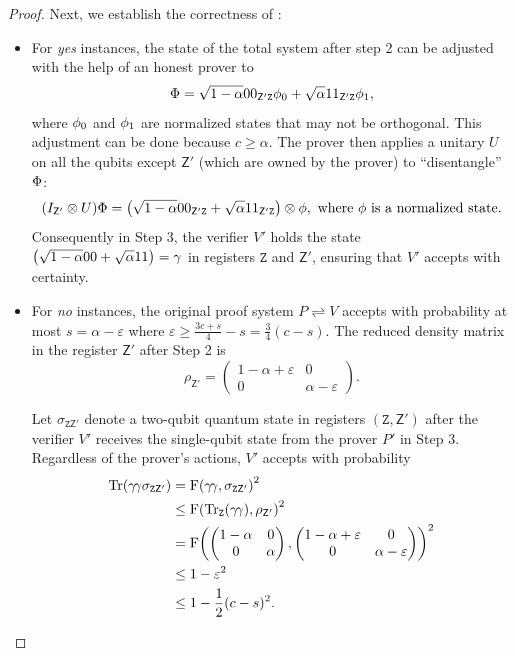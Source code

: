 \documentclass[11pt, a4paper]{article}
\numberwithin{equation}{section}
\numberwithin{figure}{section}
\newcommand{\protocol}[2]{{#1}\!\rightleftharpoons\!{#2}}
\DeclarePairedDelimiter\rbra{\lparen}{\rparen}
\let\ket\relax\DeclarePairedDelimiter\ket{\lvert}{\rangle}
\let\bra\relax\DeclarePairedDelimiter\bra{\langle}{\rvert}
\newcommand{\ketbra}[2]{\ensuremath{\ket{#1}\!\bra{#2}}}
\newcommand{\Tr}{\mathrm{Tr}}
\newcommand{\F}{\mathrm{F}}
\newcommand{\sfZ}{\mathsf{Z}}
\newcommand{\ttZ}{\mathtt{Z}}
\begin{document}
\begin{proof}
    Next, we establish the correctness of : 
    \begin{itemize}[leftmargin=2em]
        \item For \textit{yes} instances, the state of the total system after step 2 can be adjusted with the help of an honest prover to
        \[\ket{\Phi} = \sqrt{1-\alpha} \ket{00}_{\sfZ'\ttZ}\ket{\phi_0} + \sqrt{\alpha} \ket{11}_{\sfZ'\ttZ}\ket{\phi_1},\]
        where $\ket{\phi_0}$ and $\ket{\phi_1}$ are normalized states that may not be orthogonal. 
        This adjustment can be done because $c\geq\alpha$. The prover then applies a unitary $U$ on all the qubits except $\sfZ'$ (which are owned by the prover) to ``disentangle'' $\ket{\Phi}$: 
        \[ (I_{\sfZ'}\otimes U) \ket{\Phi} = \rbra*{\sqrt{1-\alpha} \ket{00}_{\sfZ'\ttZ} + \sqrt{\alpha} \ket{11}_{\sfZ'\ttZ}} \otimes \ket{\phi}, \text{ where } \ket{\phi} \text{ is a normalized state.} \]
        Consequently in Step 3, the verifier $V'$ holds the state 
        $\rbra*{\sqrt{1-\alpha} \ket{00} + \sqrt{\alpha} \ket{11}} = \ket{\gamma}$ in registers $\ttZ$ and $\sfZ'$, ensuring that $V'$ accepts with certainty. 

        \item For \textit{no} instances, the original proof system $\protocol{P}{V}$ accepts with probability at most $s = \alpha - \varepsilon$ where $\varepsilon \geq  \frac{3c+s}{4} -s = \frac{3}{4}(c-s)$. The reduced density matrix in the register $\sfZ'$ after Step 2 is 
        \[  \rho_{\sfZ'} = \begin{pmatrix} 
            1-\alpha+\varepsilon & 0\\ 0 & \alpha-\varepsilon
        \end{pmatrix}.\]
        
        Let $\sigma_{\ttZ\sfZ'}$ denote a two-qubit quantum state in registers $(\ttZ,\sfZ')$ after the verifier $V'$ receives the single-qubit state from the prover $P'$ in Step 3. 
        Regardless of the prover's actions, $V'$ accepts with probability 
        \begin{align*}
            \Tr\rbra*{\ketbra{\gamma}{\gamma}\sigma_{\ttZ\sfZ'}} 
            &= \F\rbra*{\ketbra{\gamma}{\gamma}, \sigma_{\ttZ\sfZ'}}^2 \\
            &\leq \F\rbra*{\Tr_{\ttZ}\rbra*{\ketbra{\gamma}{\gamma}}, \rho_{\sfZ'}}^2 \\
            &= \F\rbra*{\begin{pmatrix} 
                    1-\alpha & 0\\ 0 & \alpha
                \end{pmatrix},
                \begin{pmatrix} 
                    1-\alpha+\varepsilon & 0\\ 0 & \alpha-\varepsilon
                \end{pmatrix}}^2\\
            &\leq 1-\varepsilon^2\\
            &\leq 1 - \frac{1}{2}(c-s)^2.
        \end{align*}


\end{itemize}
\end{proof}
\end{document}
